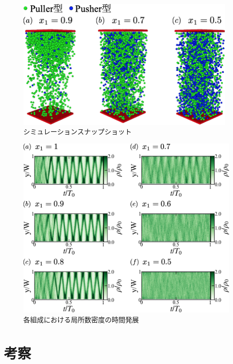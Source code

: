 \documentclass[11pt,a4j]{jarticle}
\begin{document}
\newpage
\vspace*{15truemm}
\begin{figure}[h]
\begin{center}
\includegraphics[width=110mm]{./images/snapshot.png}
\caption{シミュレーションスナップショット}
\label{snapshot}
\vspace{0truemm}
\end{center}
\end{figure}

\begin{figure}[h]
\begin{center}
\includegraphics[width=120mm]{./images/y_t_rho.png}
\caption{各組成における局所数密度の時間発展}
\label{Rho}
\vspace{0truemm}
\end{center}
\end{figure}

\newpage
\section{考察}
\end{document}
